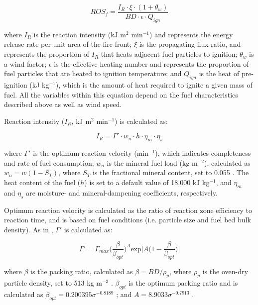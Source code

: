 \documentclass[a4paper, 12pt] {report}
\begin{document}
\begin{equation} \label{eq:ros}
	ROS_f = \frac{I_R \cdot \xi \cdot (1 + \theta_w)}{BD \cdot \epsilon \cdot Q_{ign}}
\end{equation}

where $I_R$ is the reaction intensity (kJ m$^2$ min$^{-1}$) and represents the energy release rate per unit area of the fire front; $\xi$ is the propagating flux ratio, and represents the proportion of $I_R$ that heats adjacent fuel particles to ignition; $\theta_w$ is a wind factor; $\epsilon$ is the effective heating number and represents the proportion of fuel particles that are heated to ignition temperature; and $Q_{ign}$ is the heat of pre-ignition (kJ kg$^{-1}$), which is the amount of heat required to ignite a given mass of fuel. All the variables within this equation depend on the fuel characteristics described above as well as wind speed.

Reaction intensity ($I_R$, kJ m$^2$ min$^{-1}$) is calculated as:

\begin{equation} \label{eq:ir}
	I_R = \Gamma ' \cdot w_n \cdot h \cdot \eta_m \cdot \eta_s
\end{equation}

where $\Gamma '$ is the optimum reaction velocity (min$^{-1}$), which indicates completeness and rate of fuel consumption; $w_n$ is the mineral fuel load (kg m$^{-2}$), calculated as $w_n = w(1 - S_T)$, where $S_T$ is the fractional mineral content, set to 0.055 \cite{thonickeInfluenceVegetationFire2010}.  The heat content of the fuel ($h$) is set to a default value of 18,000 kJ kg$^{-1}$, and $\eta_m$ and $\eta_s$ are moisture- and mineral-dampening coefficients, respectively.

Optimum reaction velocity is calculated as the ratio of reaction zone efficiency to reaction time, and is based on fuel conditions (i.e. particle size and fuel bed bulk density). As in , $\Gamma '$ is calculated as:

\begin{equation} \label{eq:gamma}
	\Gamma ' = \Gamma_{max} \Big( \frac{\beta}{\beta_{opt}}\Big)^A\text{exp}\Big[A\Big(1 - \frac{\beta}{\beta_{opt}}\Big)\Big]
\end{equation}

where $\beta$ is the packing ratio, calculated as $\beta = BD/\rho_p$, where $\rho_p$ is the oven-dry particle density, set to 513 kg m$^{-3}$ \cite{pyneIntroductionWildlandFire1996}. $\beta_{opt}$ is the optimum packing ratio and is calculated as $\beta_{opt} = 0.200395\sigma^{-0.8189}$ \cite{thonickeInfluenceVegetationFire2010}; and $A = 8.9033\sigma^{-0.7913}$ \cite{brownPredictingVegetationTypes1994, pyneIntroductionWildlandFire1996}.
\end{document}
